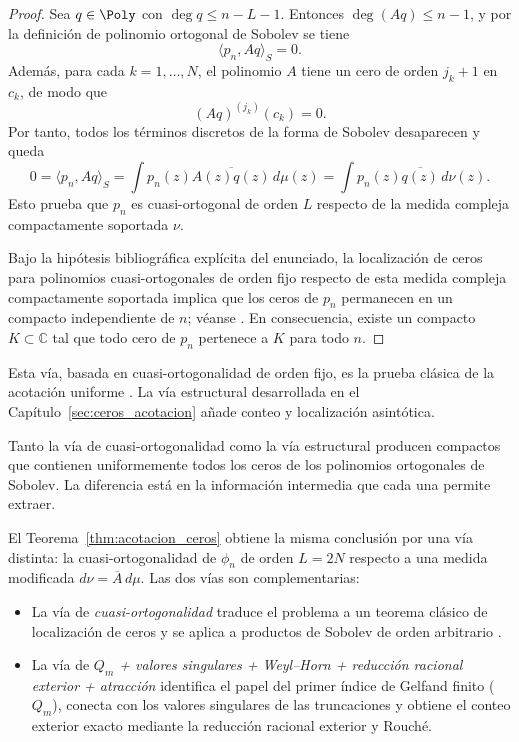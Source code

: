 \begin{proof}
	Sea $q \in \Poly$ con $\deg q \le n-L-1$. Entonces $\deg(Aq) \le n-1$, y por la definición de polinomio ortogonal de Sobolev se tiene
	\[
		\langle p_n, Aq \rangle_S = 0.
	\]
	Además, para cada $k=1,\dots,N$, el polinomio $A$ tiene un cero de orden $j_k+1$ en $c_k$, de modo que
	\[
		(Aq)^{(j_k)}(c_k)=0.
	\]
	Por tanto, todos los términos discretos de la forma de Sobolev desaparecen y queda
	\[
		0 = \langle p_n, Aq \rangle_S = \int p_n(z)\overline{A(z)q(z)}\,d\mu(z) = \int p_n(z)\overline{q(z)}\,d\nu(z).
	\]
	Esto prueba que $p_n$ es cuasi-ortogonal de orden $L$ respecto de la medida compleja compactamente soportada $\nu$.

	Bajo la hipótesis bibliográfica explícita del enunciado, la localización de ceros para polinomios cuasi-ortogonales de orden fijo respecto de esta medida compleja compactamente soportada implica que los ceros de $p_n$ permanecen en un compacto independiente de $n$; véanse \cite{lopez1999zero,lopez2001sobolev,marcellan2015sobolev}. En consecuencia, existe un compacto $K \subset \mathbb{C}$ tal que todo cero de $p_n$ pertenece a $K$ para todo $n$.
\end{proof}

\begin{rmk}\label{rem:via_clasica}
	Esta vía, basada en cuasi-ortogonalidad de orden fijo, es la prueba clásica de la acotación uniforme \cite{lopez1999zero,marcellan2015sobolev}. La vía estructural desarrollada en el Capítulo~\ref{sec:ceros_acotacion} añade conteo y localización asintótica.
\end{rmk}

\begin{rmk}
	Tanto la vía de cuasi-ortogonalidad como la vía estructural producen compactos que contienen uniformemente todos los ceros de los polinomios ortogonales de Sobolev. La diferencia está en la información intermedia que cada una permite extraer.
\end{rmk}

\begin{rmk}\label{rem:comparacion_vias}
	El Teorema~\ref{thm:acotacion_ceros} obtiene la misma conclusión por una vía distinta: la cuasi-ortogonalidad de $\phi_n$ de orden $L=2N$ respecto a una medida modificada $d\nu=\overline{A}\,d\mu$. Las dos vías son complementarias:
	\begin{itemize}
		\item La vía de \emph{cuasi-ortogonalidad} traduce el problema a un teorema clásico de localización de ceros y se aplica a productos de Sobolev de orden arbitrario \cite{lopez1999zero}.
		\item La vía de \emph{$Q_m$ + valores singulares + Weyl--Horn + reducción racional exterior + atracción} identifica el papel del primer índice de Gelfand finito ($Q_m$), conecta con los valores singulares de las truncaciones y obtiene el conteo exterior exacto mediante la reducción racional exterior y Rouché.
	\end{itemize}
\end{rmk}
